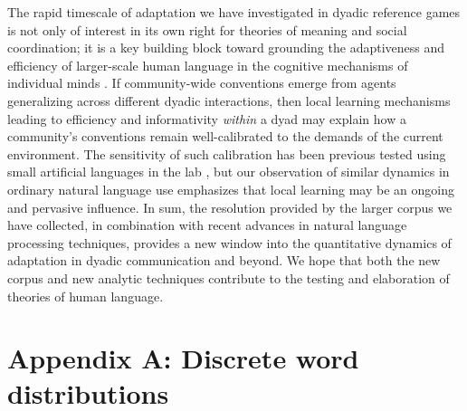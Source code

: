 \documentclass[alpha-refs]{wiley-article}
\begin{document}
The rapid timescale of adaptation we have investigated in dyadic reference games is not only of interest in its own right for theories of meaning and social coordination; it is a key building block toward grounding the adaptiveness and efficiency of larger-scale human language in the cognitive mechanisms of individual minds \citep{KirbyTamarizCornishSmith15_CompressionCommunication,gibson2019efficiency}.
If community-wide conventions emerge from agents generalizing across different dyadic interactions, then local learning mechanisms leading to efficiency and informativity \emph{within} a dyad may explain how a community's conventions remain well-calibrated to the demands of the current environment.
The sensitivity of such calibration has been previous tested using small artificial languages in the lab \cite[e.g.][]{WintersKirbySmith14_LanguagesAdapt}, but our observation of similar dynamics in ordinary natural language use emphasizes that local learning may be an ongoing and pervasive influence.
In sum, the resolution provided by the larger corpus we have collected, in combination with recent advances in natural language processing techniques, provides a new window into the quantitative dynamics of adaptation in dyadic communication and beyond.
We hope that both the new corpus and new analytic techniques contribute to the testing and elaboration of theories of human language.

%

\printendnotes



\section*{Appendix A: Discrete word distributions}
\end{document}
